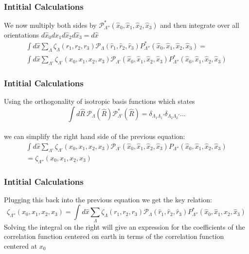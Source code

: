 \documentclass{beamer}
\begin{document}
    \begin{frame}
        \frametitle{Intitial Calculations}
        We now multiply both sides by $\mathcal P_{\Lambda ''}^*(\hat x_0, \hat x_1, \hat x_2, \hat x_3)$ and then integrate over all orientations
        $d \hat x_0 d \hat x_1 d \hat x_2 d \hat x_3 = d \hat x$
        \begin{eqnarray*}
            \int d \hat x \sum_{\Lambda} \zeta_{\Lambda}(r_1, r_2, r_3) \mathcal P_{\Lambda}(\hat r_1, \hat r_2, \hat r_3) P^*_{\Lambda ''}(\hat x_0, \hat x_1, \hat x_2, \hat x_3) = \\
            \int d \hat x \sum_{\Lambda '} \zeta_{\Lambda '}(x_0, x_1, x_2, x_3) \mathcal P_{\Lambda '}(\hat x_0, \hat x_1, \hat x_2, \hat x_3) P^*_{\Lambda ''}(\hat x_0, \hat x_1, \hat x_2, \hat x_3)
        \end{eqnarray*}
    \end{frame}

    \begin{frame}
        \frametitle{Intitial Calculations}
        Using the orthogonality of isotropic basis functions which states\\
        $$\int d \hat R \ \mathcal P_{\Lambda}(\hat R) \mathcal P^*_{\Lambda'}(\hat R) = \delta_{\Lambda_1 \Lambda_1'}\delta_{\Lambda_2 \Lambda_2'}...$$\\
        we can simplify the right hand side of the previous equation:
        \begin{multline*}
            \int d \hat x \sum_{\Lambda '} \zeta_{\Lambda '}(x_0, x_1, x_2, x_3) \mathcal P_{\Lambda '}(\hat x_0, \hat x_1, \hat x_2, \hat x_3) P_{\Lambda ''}(\hat x_0, \hat x_1, \hat x_2, \hat x_3)\\
            =\zeta_{\Lambda ''}(x_0, x_1, x_2, x_3)
        \end{multline*}
    \end{frame}

    \begin{frame}
        \frametitle{Intitial Calculations}
        Plugging this back into the previous equation we get the key relation:
        \begin{equation}
            \label{main_eq}
            \boxed{\zeta_{\Lambda ''}(x_0, x_1, x_2, x_3) = \int d \hat x \sum_{\Lambda} \zeta_{\Lambda}(r_1, r_2, r_3) \mathcal P_{\Lambda}(\hat r_1, \hat r_2, \hat r_3) P^*_{\Lambda ''}(\hat x_0, \hat x_1, \hat x_2, \hat x_3)}
        \end{equation}
        Solving the integral on the right will
        give an expression for the coefficients of the correlation function centered 
        on earth in terms of the correlation function centered at $x_0$
    \end{frame}
\end{document}
